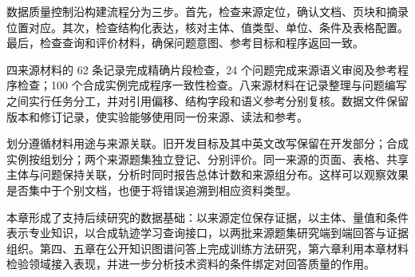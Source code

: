 数据质量控制沿构建流程分为三步。首先，检查来源定位，确认文档、页块和摘录位置对应。其次，检查结构化表达，核对主体、值类型、单位、条件及表格配置。最后，检查查询和评价材料，确保问题意图、参考目标和程序返回一致。

四来源材料的 62 条记录完成精确片段检查，24 个问题完成来源语义审阅及参考程序检查；100 个合成实例完成程序一致性检查。八来源材料在记录整理与问题编写之间实行任务分工，并对引用偏移、结构字段和语义参考分别复核。数据文件保留版本和修订记录，使实验能够使用同一份来源、读法和参考。

划分遵循材料用途与来源关联。旧开发目标及其中英文改写保留在开发部分；合成实例按组划分；两个来源题集独立登记、分别评价。同一来源的页面、表格、共享主体与问题保持关联，分析时同时报告总体计数和来源组分布。这样可以观察效果是否集中于个别文档，也便于将错误追溯到相应资料类型。

本章形成了支持后续研究的数据基础：以来源定位保存证据，以主体、量值和条件表示专业知识，以合成轨迹学习查询接口，以两批来源题集研究端到端回答与证据组织。第四、五章在公开知识图谱问答上完成训练方法研究，第六章利用本章材料检验领域接入表现，并进一步分析技术资料的条件绑定对回答质量的作用。

